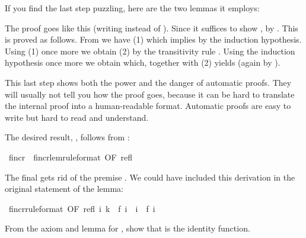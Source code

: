 \begin{isabellebody}
\begin{isamarkuptext}
\noindent
If you find the last step puzzling, here are the two lemmas it employs:
\begin{isabelle}
\isanewline
{}
\end{isabelle}
%
The proof goes like this (writing  instead of ).
Since  it suffices to show
\hbox{},
by \@.  This is
proved as follows. From  we have 
(1) which implies  by the induction hypothesis.
Using (1) once more we obtain  (2) by the transitivity
rule .
Using the induction hypothesis once more we obtain 
which, together with (2) yields  (again by
).

This last step shows both the power and the danger of automatic proofs.  They
will usually not tell you how the proof goes, because it can be hard to
translate the internal proof into a human-readable format.  Automatic
proofs are easy to write but hard to read and understand.

The desired result, , follows from :%
\end{isamarkuptext}%
\ f{\isacharunderscore}incr\ {\isacharequal}\ f{\isacharunderscore}incr{\isacharunderscore}lem{\isacharbrackleft}rule{\isacharunderscore}format{\isacharcomma}\ OF\ refl{\isacharbrackright}%
\begin{isamarkuptext}%
\noindent
The final  gets rid of the premise . 
We could have included this derivation in the original statement of the lemma:%
\end{isamarkuptext}%
\ f{\isacharunderscore}incr{\isacharbrackleft}rule{\isacharunderscore}format{\isacharcomma}\ OF\ refl{\isacharbrackright}{\isacharcolon}\ {\isachardoublequote}{\isasymforall}i{\isachardot}\ k\ {\isacharequal}\ f\ i\ {\isasymlongrightarrow}\ i\ {\isasymle}\ f\ i{\isachardoublequote}%
\begin{isamarkuptext}%
\begin{exercise}
From the axiom and lemma for , show that  is the
identity function.
\end{exercise}


\end{isamarkuptext}
\end{isabellebody}
